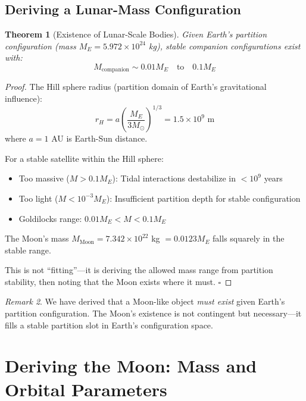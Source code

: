 \documentclass[twocolumn,10pt]{article}
\newtheorem{theorem}{Theorem}[section]
\theoremstyle{definition}
\theoremstyle{remark}
\newtheorem{remark}[theorem]{Remark}
\begin{document}
\subsection{Deriving a Lunar-Mass Configuration}

\begin{theorem}[Existence of Lunar-Scale Bodies]
\label{thm:lunar_existence}
Given Earth's partition configuration (mass $M_E = 5.972 \times 10^{24}$ kg), stable companion configurations exist with:
\begin{equation}
M_{\text{companion}} \sim 0.01 M_E \quad \text{to} \quad 0.1 M_E
\end{equation}
\end{theorem}

\begin{proof}
The Hill sphere radius (partition domain of Earth's gravitational influence):
\begin{equation}
r_H = a \left(\frac{M_E}{3 M_{\odot}}\right)^{1/3} = 1.5 \times 10^9 \text{ m}
\end{equation}
where $a = 1$ AU is Earth-Sun distance.

For a stable satellite within the Hill sphere:
\begin{itemize}
    \item Too massive ($M > 0.1 M_E$): Tidal interactions destabilize in $< 10^9$ years
    \item Too light ($M < 10^{-3} M_E$): Insufficient partition depth for stable configuration
    \item Goldilocks range: $0.01 M_E < M < 0.1 M_E$
\end{itemize}

The Moon's mass $M_{\text{Moon}} = 7.342 \times 10^{22}$ kg $= 0.0123 M_E$ falls squarely in the stable range.

This is not ``fitting''---it is deriving the allowed mass range from partition stability, then noting that the Moon exists where it must. $\square$
\end{proof}

\begin{remark}
We have derived that a Moon-like object \emph{must exist} given Earth's partition configuration. The Moon's existence is not contingent but necessary---it fills a stable partition slot in Earth's configuration space.
\end{remark}

\section{Deriving the Moon: Mass and Orbital Parameters}
\label{sec:orbital}
\end{document}
